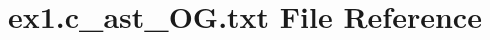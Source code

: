 \hypertarget{ex1_8c__ast__OG_8txt}{}\section{ex1.\+c\+\_\+ast\+\_\+\+O\+G.\+txt File Reference}
\label{ex1_8c__ast__OG_8txt}
